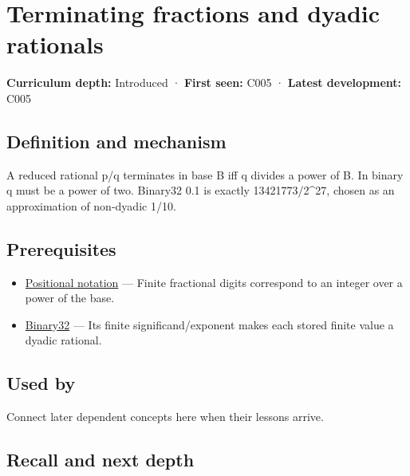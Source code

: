 \hypertarget{appendix-2a2f1b74bdd3}{}\label{referencestart:appendix-2a2f1b74bdd3}
\section{Terminating fractions and dyadic rationals}\label{appendix-2a2f1b74bdd3-terminating-fractions-and-dyadic-rationals}

\textbf{Curriculum depth:} Introduced · \textbf{First seen:} C005 · \textbf{Latest development:} C005

\begin{allmightroledefinition}

\subsection{Definition and mechanism}\label{appendix-2a2f1b74bdd3-definition-and-mechanism}

A reduced rational p/q terminates in base B iff q divides a power of B. In binary q must be a power of two. Binary32 0.1 is exactly 13421773/2\^{}27, chosen as an approximation of non-dyadic 1/10.

\end{allmightroledefinition}

\subsection{Prerequisites}\label{appendix-2a2f1b74bdd3-prerequisites}

\begin{itemize}
\tightlist
\item
  \hyperref[appendix-83c3f28f7bda]{Positional notation} --- Finite fractional digits correspond to an integer over a power of the base.
\item
  \hyperref[appendix-5057f9ad327f]{Binary32} --- Its finite significand/exponent makes each stored finite value a dyadic rational.
\end{itemize}

\subsection{Used by}\label{appendix-2a2f1b74bdd3-used-by}

Connect later dependent concepts here when their lessons arrive.

\subsection{Recall and next depth}\label{appendix-2a2f1b74bdd3-recall-and-next-depth}

